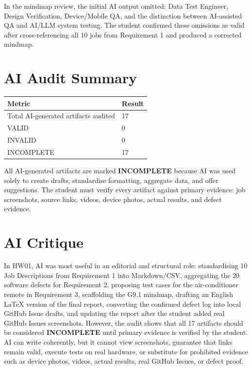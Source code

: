 \documentclass[12pt, a4paper]{article}
\newcommand{\incomplete}{\textcolor{warnorng}{\textbf{INCOMPLETE}}}
\begin{document}
In the mindmap review, the initial AI output omitted: Data Test Engineer, Design Verification, Device/Mobile QA, and the distinction between AI-assisted QA and AI/LLM system testing. The student confirmed these omissions as valid after cross-referencing all 10 jobs from Requirement 1 and produced a corrected mindmap.

\section{AI Audit Summary}

\begin{table}[h!]
\centering
\begin{tabularx}{\textwidth}{L{6cm} C{4cm}}
\toprule
\textbf{Metric} & \textbf{Result} \\
\midrule
Total AI-generated artifacts audited & 17 \\
VALID                                & 0 \\
INVALID                              & 0 \\
INCOMPLETE                           & 17 \\
\bottomrule
\end{tabularx}
\end{table}

All AI-generated artifacts are marked \incomplete{} because AI was used solely to create drafts, standardise formatting, aggregate data, and offer suggestions. The student must verify every artifact against primary evidence: job screenshots, source links, videos, device photos, actual results, and defect evidence.

\section{AI Critique}

In HW01, AI was most useful in an editorial and structural role: standardising 10 Job Descriptions from Requirement 1 into Markdown/CSV, aggregating the 20 software defects for Requirement 2, proposing test cases for the air-conditioner remote in Requirement 3, scaffolding the G9.1 mindmap, drafting an English LaTeX version of the final report, converting the confirmed defect log into local GitHub Issue drafts, and updating the report after the student added real GitHub Issues screenshots. However, the audit shows that all 17 artifacts should be considered \textbf{INCOMPLETE} until primary evidence is verified by the student. AI can write coherently, but it cannot view screenshots, guarantee that links remain valid, execute tests on real hardware, or substitute for prohibited evidence such as device photos, videos, actual results, real GitHub Issues, or defect proof.
\end{document}

